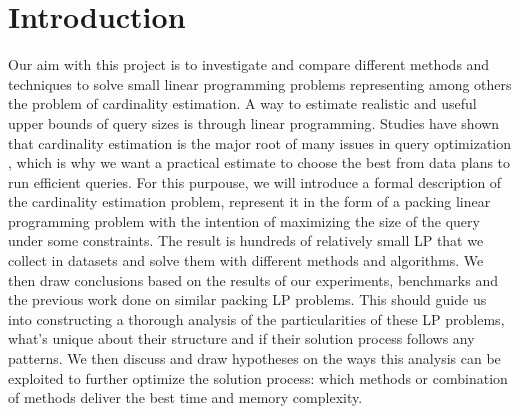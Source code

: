
\chapter{Introduction}\label{chapter:introduction}

Our aim with this project is to investigate and compare different methods 
and techniques to solve small linear programming problems representing 
among others the problem of cardinality estimation. A way to estimate realistic and
useful upper bounds of query sizes is through linear programming.
 Studies have 
shown that cardinality estimation is the major root of many issues in 
query optimization \parencite{ngo2022information}, which is why we want a 
practical estimate to choose
the best from data plans to run efficient queries.
For this purpouse, we will introduce a formal description of the cardinality
estimation problem, represent it in the form of a packing linear programming problem with
the intention of maximizing the size of the query under some constraints. The result is
hundreds of relatively small LP that we collect in datasets and solve them 
with different methods and algorithms. We then draw conclusions based on the results of
our experiments, benchmarks and the previous work done on similar packing LP problems.
This should guide us into constructing a thorough analysis of the particularities of
these LP problems, what's unique about their structure and if their solution
process follows any patterns. We then discuss and draw hypotheses on the ways this 
analysis can be exploited to further optimize the solution process: which methods or 
combination of methods deliver the best time and memory complexity.
